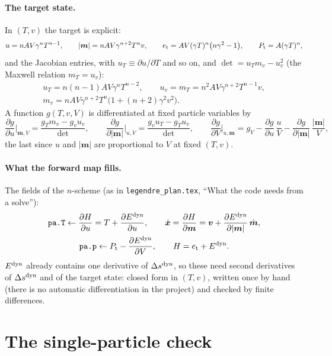 \documentclass[11pt,aps,preprint,nofootinbib,superscriptaddress,tightenlines]{revtex4-2}
\def\st{\begin{equation}}
\def\stp{\end{equation}}
\let\oldparagraph\paragraph
\renewcommand{\paragraph}{\par\bigskip\oldparagraph}
\begin{document}
\paragraph{The target state.}  In $(T,v)$ the target is explicit:
\st
u=nAV\gamma^nT^{n-1},\qquad |\bm m|=nAV\gamma^{n+2}T^nv,\qquad e_{\rm t}=AV(\gamma T)^n\big(n\gamma^2-1\big),\qquad P_{\rm t}=A(\gamma T)^n ,
\stp
and the Jacobian entries, with $u_T\equiv\partial u/\partial T$ and so on, and $\det=u_Tm_v-u_v^2$ (the Maxwell relation $m_T=u_v$):
\st
\begin{gathered}
u_T=n(n-1)AV\gamma^nT^{n-2},\qquad u_v=m_T=n^2AV\gamma^{n+2}T^{n-1}v,\\
m_v=nAV\gamma^{n+2}T^n\big(1+(n+2)\gamma^2v^2\big) .
\end{gathered}
\stp
A function $g(T,v,V)$ is differentiated at fixed particle variables by
\st
\frac{\partial g}{\partial u}\Big|_{\bm m,V}=\frac{g_Tm_v-g_vu_v}{\det},\qquad
\frac{\partial g}{\partial|\bm m|}\Big|_{u,V}=\frac{g_vu_T-g_Tu_v}{\det},\qquad
\frac{\partial g}{\partial V}\Big|_{u,\bm m}=g_V-\frac{\partial g}{\partial u}\,\frac uV-\frac{\partial g}{\partial|\bm m|}\,\frac{|\bm m|}V ,
\label{chain}
\stp
the last since $u$ and $|\bm m|$ are proportional to $V$ at fixed $(T,v)$.

\paragraph{What the forward map fills.}  The fields of the $n$-scheme (as in \nolinkurl{legendre_plan.tex}, ``What the code needs from a solve''):
\st
\begin{gathered}
\texttt{pa.T}\leftarrow\frac{\partial H}{\partial u}=T+\frac{\partial E^{\rm dyn}}{\partial u},\qquad
\dot{\bm x}=\frac{\partial H}{\partial\bm m}=\bm v+\frac{\partial E^{\rm dyn}}{\partial|\bm m|}\,\hat{\bm m},\\
\texttt{pa.p}\leftarrow P_{\rm t}-\frac{\partial E^{\rm dyn}}{\partial V},\qquad H=e_{\rm t}+E^{\rm dyn} .
\end{gathered}
\label{fields}
\stp
$E^{\rm dyn}$ already contains one derivative of $\Delta s^{\rm dyn}$, so these need second derivatives of $\Delta s^{\rm dyn}$ and of the target state: closed form in
$(T,v)$, written once by hand (there is no automatic differentiation in the project) and checked by finite differences.

\section{The single-particle check}
\label{sec:check}
\end{document}
